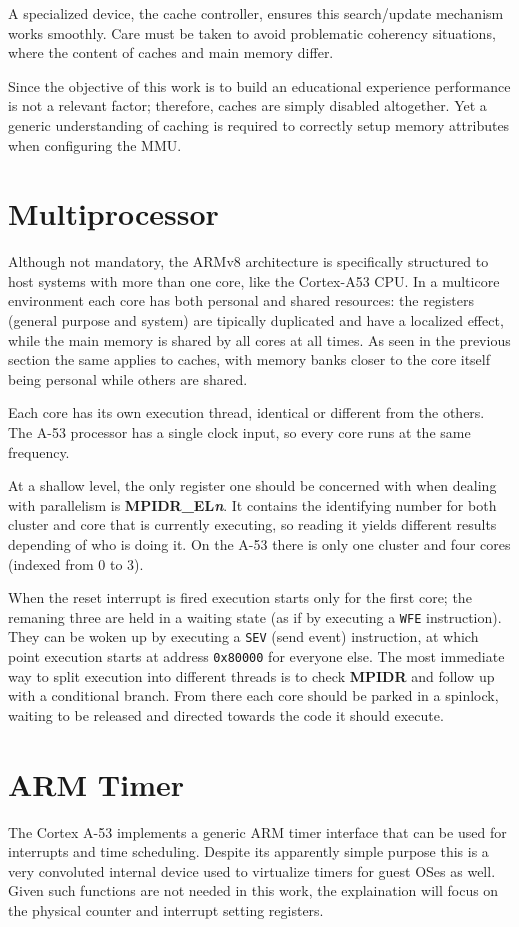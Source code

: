 \documentclass[12pt,a4paper,openright,twoside]{report}
\begin{document}
A specialized device, the cache controller, ensures this search/update mechanism
works smoothly. Care must be taken to avoid problematic coherency situations, where
the content of caches and main memory differ.

Since the objective of this work is to build an educational experience performance
is not a relevant factor; therefore, caches are simply disabled altogether.
Yet a generic understanding of caching is required to correctly setup memory
attributes when configuring the MMU.

\section{Multiprocessor}
Although not mandatory, the ARMv8 architecture is specifically structured to 
host systems with more than one core, like the Cortex-A53 CPU.
In a multicore environment each core has both personal and shared resources:
the registers (general purpose and system) are tipically duplicated and have a
localized effect, while the main memory is shared by all cores at all times.
As seen in the previous section the same applies to caches, with memory banks closer
to the core itself being personal while others are shared.

Each core has its own execution thread, identical or different from 
the others. The A-53 processor has a single clock input, so every core runs at
the same frequency.

At a shallow level, the only register one should be concerned with when dealing 
with parallelism is \textbf{MPIDR\_EL\textit{n}}. It contains the identifying number
for both cluster and core that is currently executing, so reading it yields different
results depending of who is doing it. On the A-53 there is only
one cluster and four cores (indexed from 0 to 3).

When the reset interrupt is fired execution starts only for the first core; the
remaning three are held in a waiting state (as if by executing a {\tt WFE} instruction).
They can be woken up by executing a {\tt SEV} (send event) instruction, at which
point execution starts at address {\tt 0x80000} for everyone else.
The most immediate way to split execution into different threads is to check 
\textbf{MPIDR} and follow up with a conditional branch. From there each core should be parked in 
a spinlock, waiting to be released and directed towards the code it should
execute.

\section{ARM Timer}
The Cortex A-53 implements a generic ARM timer interface that can be used for interrupts
and time scheduling. Despite its apparently simple purpose this is a very convoluted
internal device used to virtualize timers for guest OSes as well.
Given such functions are not needed in this work, the explaination will focus 
on the physical counter and interrupt setting registers.
\end{document}

